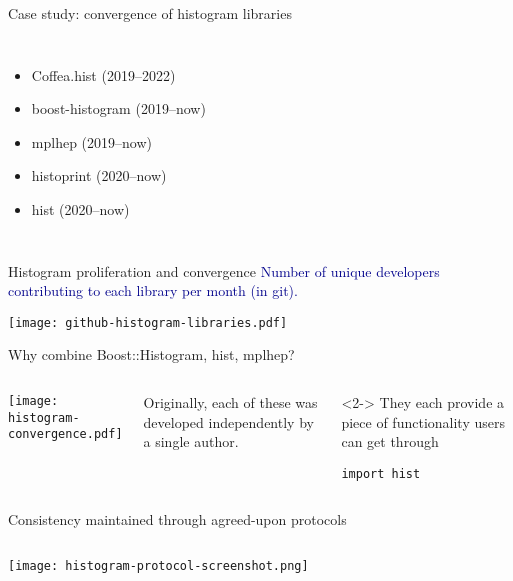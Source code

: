 \begin{frame}{Case study: convergence of histogram libraries}
\begin{uncoverenv}
\begin{columns}
\begin{itemize}
\item Coffea.hist (2019--2022)
\item boost-histogram (2019--now)
\item mplhep (2019--now)
\item histoprint (2020--now)
\item hist (2020--now)
\end{itemize}

\end{columns}
\end{uncoverenv}
\end{frame}

\begin{frame}{Histogram proliferation and convergence}
\vspace{0.25 cm}
\textcolor{darkblue}{Number of unique developers contributing to each library per month (in git).}

\texttt{[image: github-histogram-libraries.pdf]}
\end{frame}

\begin{frame}[fragile]{Why combine Boost::Histogram, hist, mplhep?}
\vspace{0.5 cm}
\begin{columns}
\texttt{[image: histogram-convergence.pdf]}

Originally, each of these was developed independently by a single author.

\vspace{0.75 cm}
\begin{uncoverenv}<2->
They each provide a piece of functionality users can get through

\begin{verbatim}
import hist
\end{verbatim}
\end{uncoverenv}

\vspace{0.75 cm}
\end{columns}
\end{frame}

\begin{frame}{Consistency maintained through agreed-upon protocols}
\vspace{0.5 cm}
\begin{columns}
\texttt{[image: histogram-protocol-screenshot.png]}
\end{columns}
\end{frame}
